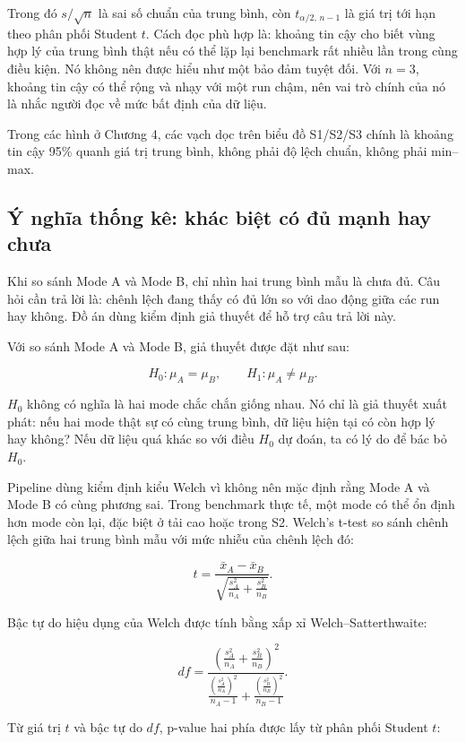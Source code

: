 Trong đó \(s/\sqrt{n}\) là sai số chuẩn của trung bình, còn \(t_{\alpha/2,\,n-1}\) là giá trị tới hạn theo phân phối Student \(t\). Cách đọc phù hợp là: khoảng tin cậy cho biết vùng hợp lý của trung bình thật nếu có thể lặp lại benchmark rất nhiều lần trong cùng điều kiện. Nó không nên được hiểu như một bảo đảm tuyệt đối. Với \(n=3\), khoảng tin cậy có thể rộng và nhạy với một run chậm, nên vai trò chính của nó là nhắc người đọc về mức bất định của dữ liệu.

Trong các hình ở Chương 4, các vạch dọc trên biểu đồ S1/S2/S3 chính là khoảng tin cậy 95\% quanh giá trị trung bình, không phải độ lệch chuẩn, không phải min--max.

\subsection{Ý nghĩa thống kê: khác biệt có đủ mạnh hay chưa}
Khi so sánh Mode A và Mode B, chỉ nhìn hai trung bình mẫu là chưa đủ. Câu hỏi cần trả lời là: chênh lệch đang thấy có đủ lớn so với dao động giữa các run hay không.  Đồ án dùng kiểm định giả thuyết để hỗ trợ câu trả lời này.

Với so sánh Mode A và Mode B, giả thuyết được đặt như sau:

\[
H_0: \mu_A = \mu_B, \qquad H_1: \mu_A \ne \mu_B.
\]

\(H_0\) không có nghĩa là hai mode chắc chắn giống nhau. Nó chỉ là giả thuyết xuất phát: nếu hai mode thật sự có cùng trung bình, dữ liệu hiện tại có còn hợp lý hay không? Nếu dữ liệu quá khác so với điều \(H_0\) dự đoán, ta có lý do để bác bỏ \(H_0\).

Pipeline dùng kiểm định kiểu Welch vì không nên mặc định rằng Mode A và Mode B có cùng phương sai. Trong benchmark thực tế, một mode có thể ổn định hơn mode còn lại, đặc biệt ở tải cao hoặc trong S2. Welch's t-test so sánh chênh lệch giữa hai trung bình mẫu với mức nhiễu của chênh lệch đó:

\[
t =
\frac{\bar{x}_A-\bar{x}_B}
{\sqrt{\frac{s_A^2}{n_A}+\frac{s_B^2}{n_B}}}.
\]

Bậc tự do hiệu dụng của Welch được tính bằng xấp xỉ Welch--Satterthwaite:

\[
df =
\frac{
\left(\frac{s_A^2}{n_A}+\frac{s_B^2}{n_B}\right)^2
}{
\frac{\left(\frac{s_A^2}{n_A}\right)^2}{n_A-1}
+
\frac{\left(\frac{s_B^2}{n_B}\right)^2}{n_B-1}
}.
\]

Từ giá trị \(t\) và bậc tự do \(df\), p-value hai phía được lấy từ phân phối Student \(t\):

